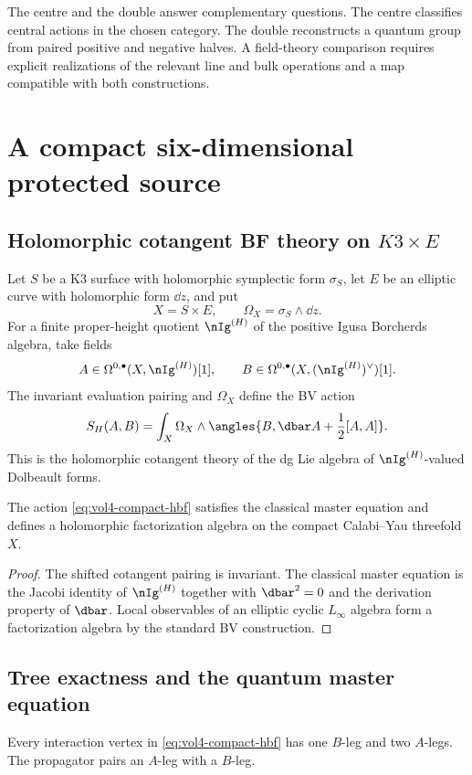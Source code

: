 The centre and the double answer complementary questions.
The centre classifies central actions in the chosen category.
The double reconstructs a quantum group from paired positive and negative halves.
A field-theory comparison requires explicit realizations of the relevant
line and bulk operations and a map compatible with both constructions.

\part{A compact six-dimensional protected source}

\chapter{Holomorphic cotangent BF theory on \texorpdfstring{$K3\times E$}{K3 x E}}
Let $S$ be a K3 surface with holomorphic symplectic form $\sigma_S$, let $E$ be an elliptic curve with holomorphic form $\dd z$, and put
\[
 X=S\times E,
 \qquad
 \Omega_X=\sigma_S\wedge\dd z.
\]
For a finite proper-height quotient $\nIg^{(H)}$ of the positive Igusa Borcherds algebra, take fields
\[
 A\in\Omega^{0,\bullet}(X,\nIg^{(H)})[1],
 \qquad
 B\in\Omega^{0,\bullet}(X,(\nIg^{(H)})^\vee)[1].
\]
The invariant evaluation pairing and $\Omega_X$ define the BV action
\begin{equation}\label{eq:vol4-compact-hbf}
 S_H(A,B)=
 \int_X\Omega_X\wedge
 \angles{B,\dbar A+\frac12[A,A]}.
\end{equation}
This is the holomorphic cotangent theory of the dg Lie algebra of $\nIg^{(H)}$-valued Dolbeault forms.

\begin{theorem}
The action \eqref{eq:vol4-compact-hbf} satisfies the classical master equation and defines a holomorphic factorization algebra on the compact Calabi--Yau threefold $X$.
\end{theorem}
\begin{proof}
The shifted cotangent pairing is invariant.  The classical master equation is the Jacobi identity of $\nIg^{(H)}$ together with $\dbar^2=0$ and the derivation property of $\dbar$.  Local observables of an elliptic cyclic $L_\infty$ algebra form a factorization algebra by the standard BV construction.
\end{proof}

\chapter{Tree exactness and the quantum master equation}
Every interaction vertex in \eqref{eq:vol4-compact-hbf} has one $B$-leg and two $A$-legs.  The propagator pairs an $A$-leg with a $B$-leg.

